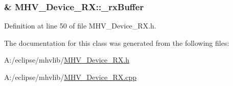 \hypertarget{class_m_h_v___device___r_x_a868bacb2136afc4d3dad8d06f93847da}{
\subsubsection[{\-\_\-rx\-Buffer}]{\& {\bf \-M\-H\-V\-\_\-\-Device\-\_\-\-R\-X\-::\-\_\-rx\-Buffer}}}
\label{class_m_h_v___device___r_x_a868bacb2136afc4d3dad8d06f93847da}


\-Definition at line 50 of file \-M\-H\-V\-\_\-\-Device\-\_\-\-R\-X.\-h.



\-The documentation for this class was generated from the following files\-:\begin{DoxyCompactItemize}
\item 
\-A\-:/eclipse/mhvlib/\hyperlink{_m_h_v___device___r_x_8h}{\-M\-H\-V\-\_\-\-Device\-\_\-\-R\-X.\-h}\item 
\-A\-:/eclipse/mhvlib/\hyperlink{_m_h_v___device___r_x_8cpp}{\-M\-H\-V\-\_\-\-Device\-\_\-\-R\-X.\-cpp}\end{DoxyCompactItemize}
